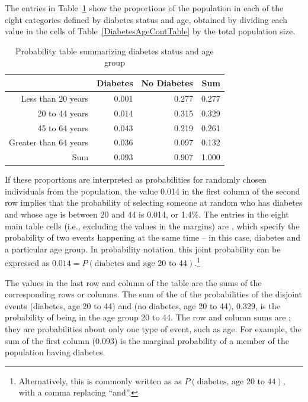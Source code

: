 The entries in Table~\ref{DiabetesAgeProbTable} show the proportions of the population in each of the eight categories defined by diabetes status and age, obtained by dividing each value in the cells of Table~\ref{DiabetesAgeContTable} by the total population size.


\begin{table}[ht]
	\centering
	\begin{tabular}{rrrr}
		\hline
		& Diabetes & No Diabetes & Sum \\ 
		\hline
		Less than 20 years & 0.001 & 0.277 & 0.277 \\ 
		20 to 44 years & 0.014 & 0.315 & 0.329 \\ 
		45 to 64 years & 0.043 & 0.219 & 0.261 \\ 
		Greater than 64 years & 0.036 & 0.097 & 0.132 \\ 
		Sum & 0.093 & 0.907 & 1.000 \\ 
		\hline
	\end{tabular}
	\caption{Probability table summarizing diabetes status and age group}
	\label{DiabetesAgeProbTable}
\end{table}

If these proportions are interpreted as probabilities for randomly chosen individuals from the population, the value 0.014 in the first column of the second row implies that the probability of selecting someone at random who has diabetes and whose age is between 20 and 44 is 0.014, or 1.4\%. The entries in the eight main table cells (i.e., excluding the values in the margins) are , which specify the probability of two events happening at the same time -- in this case, diabetes and a particular age group. In probability notation, this joint probability can be expressed as $0.014 = P(\text{diabetes and age 20 to 44})$.\footnote{Alternatively, this is commonly written as as $P(\text{diabetes, age 20 to 44})$, with a comma replacing ``and''.}

The values in the last row and column of the table are the sums of the corresponding rows or columns. The sum of the of the probabilities of the disjoint events (diabetes, age 20 to 44) and (no diabetes, age 20 to 44), 0.329, is the probability of being in the age group 20 to 44. The row and column sums are ; they are probabilities about only one type of event, such as age. For example, the sum of the first column (0.093) is the marginal probability of a member of the population having diabetes.

